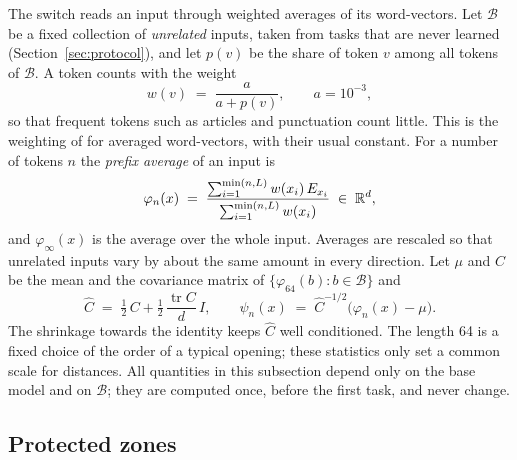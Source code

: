 The switch reads an input through weighted averages of its word-vectors. Let $\mathcal{B}$ be a
fixed collection of \emph{unrelated} inputs, taken from tasks that are never learned
(Section~\ref{sec:protocol}), and let $p(v)$ be the share of token $v$ among all tokens of
$\mathcal{B}$. A token counts with the weight
\begin{equation}
  w(v) \;=\; \frac{a}{a + p(v)} , \qquad a = 10^{-3},
  \label{eq:weights}
\end{equation}
so that frequent tokens such as articles and punctuation count little. This is the weighting of
\citet{arora2017simple} for averaged word-vectors, with their usual constant. For a number of
tokens $n$ the \emph{prefix average} of an input is
\begin{equation}
  \varphi_n(x) \;=\; \frac{\sum_{i=1}^{\min(n, L)} w(x_i)\, E_{x_i}}{\sum_{i=1}^{\min(n, L)} w(x_i)} \;\in\; \mathbb{R}^d ,
  \label{eq:prefix}
\end{equation}
and $\varphi_\infty(x)$ is the average over the whole input. Averages are rescaled so that
unrelated inputs vary by about the same amount in every direction. Let $\mu$ and $C$ be the mean
and the covariance matrix of $\{\varphi_{64}(b) : b \in \mathcal{B}\}$ and
\begin{equation}
  \hat{C} \;=\; \tfrac{1}{2}\, C + \tfrac{1}{2}\, \frac{\operatorname{tr} C}{d}\, I ,
  \qquad
  \psi_n(x) \;=\; \hat{C}^{-1/2} \bigl( \varphi_n(x) - \mu \bigr) .
  \label{eq:whiten}
\end{equation}
The shrinkage towards the identity keeps $\hat{C}$ well conditioned. The length 64 is a fixed
choice of the order of a typical opening; these statistics only set a common scale for distances.
All quantities in this subsection depend only on the base model and on $\mathcal{B}$; they are
computed once, before the first task, and never change.

\subsection{Protected zones}
\label{sec:zones}


